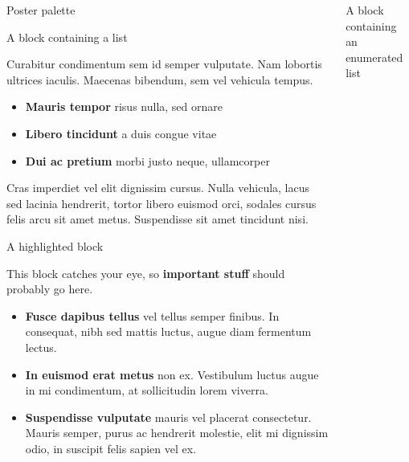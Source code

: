\begin{columns}[t]
\begin{column}{\colwidth}
\begin{block}{Poster palette}
  \end{block}

  \begin{block}{A block containing a list}

    Curabitur condimentum sem id semper vulputate. Nam lobortis ultrices
    iaculis. Maecenas bibendum, sem vel vehicula tempus.

    \begin{itemize}
      \item \textbf{Mauris tempor} risus nulla, sed ornare
      \item \textbf{Libero tincidunt} a duis congue vitae
      \item \textbf{Dui ac pretium} morbi justo neque, ullamcorper
    \end{itemize}

    Cras imperdiet vel elit dignissim cursus. Nulla vehicula, lacus sed lacinia
    hendrerit, tortor libero euismod orci, sodales cursus felis arcu sit amet
    metus. Suspendisse sit amet tincidunt nisi.

  \end{block}

  \begin{alertblock}{A highlighted block}

    This block catches your eye, so \textbf{important stuff} should probably go
    here.

    \begin{itemize}
      \item \textbf{Fusce dapibus tellus} vel tellus semper finibus. In
        consequat, nibh sed mattis luctus, augue diam fermentum lectus.
      \item \textbf{In euismod erat metus} non ex. Vestibulum luctus augue in
        mi condimentum, at sollicitudin lorem viverra.
      \item \textbf{Suspendisse vulputate} mauris vel placerat consectetur.
        Mauris semper, purus ac hendrerit molestie, elit mi dignissim odio, in
        suscipit felis sapien vel ex.
    \end{itemize}

  \end{alertblock}

\end{column}

\separatorcolumn

\begin{column}{\colwidth}

  \begin{block}{A block containing an enumerated list}


\end{block}
\end{column}
\end{columns}
